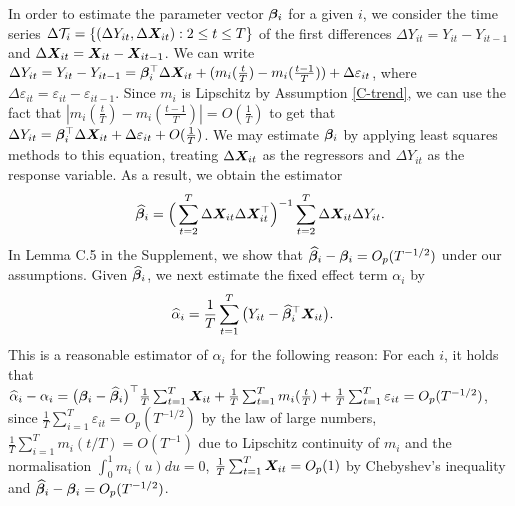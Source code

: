 \documentclass[12pt]{article}
\begin{document}
In order to estimate the parameter vector $\bm{\beta}_i$ for a given $i$, we consider the time series $\Delta \mathcal{T}_i = \{(\Delta Y_{it}, \Delta \boldsymbol{X}_{it}): 2 \leq t \leq T\}$ of the first differences $\Delta Y_{it} = Y_{it} - Y_{i t-1}$ and $\Delta  \boldsymbol{X}_{it} =  \boldsymbol{X}_{it} - \boldsymbol{X}_{it-1}$. We can write $\Delta Y_{it} = Y_{it} - Y_{i t-1} =\bm{\beta}_i^\top \Delta \boldsymbol{X}_{it} + (m_i (\frac{t}{T}) - m_i (\frac{t-1}{T})) + \Delta \varepsilon_{it}$, where $ \Delta \varepsilon_{it} = \varepsilon_{it} - \varepsilon_{i t-1}$. Since $m_i$ is Lipschitz by Assumption \ref{C-trend}, we can use the fact that $ |m_i ( \frac{t}{T} ) - m_i (\frac{t-1}{T}) | = O(\frac{1}{T})$ to get that $\Delta Y_{it} = \bm{\beta}_i^\top \Delta \boldsymbol{X}_{it} + \Delta \varepsilon_{it} + O(\frac{1}{T})$. We may estimate $\bm{\beta}_i$ by applying least squares methods to this equation, treating $\Delta \boldsymbol{X}_{it}$ as the regressors and $\Delta Y_{it}$ as the response variable. As a result, we obtain the estimator
\begin{align}\label{eq:beta:est}
\widehat{\bm{\beta}}_i = \Big( \sum_{t=2}^T \Delta \boldsymbol{X}_{it} \Delta \boldsymbol{X}_{it}^\top \Big)^{-1} \sum_{t=2}^T \Delta \boldsymbol{X}_{it} \Delta Y_{it}.
\end{align}
In Lemma C.5 %
in the Supplement, we show that $\widehat{\bm{\beta}}_i - \bm{\beta}_i = O_p(T^{-1/2})$ under our assumptions. Given $\widehat{\bm{\beta}}_i$, we next estimate the fixed effect term $\alpha_i$ by 
\begin{align}\label{eq:alpha:est}
\widehat{\alpha}_i &= \frac{1}{T}\sum_{t=1}^T \big(Y_{it} - \widehat{\bm{\beta}}_i^\top \boldsymbol{X}_{it}\big). 
\end{align}
This is a reasonable estimator of $\alpha_i$ for the following reason: For each $i$, it holds that $\widehat{\alpha}_i - \alpha_i = \big(\bm{\beta}_i - \widehat{\bm{\beta}}_i \big)^\top\frac{1}{T}\sum_{t=1}^T  \boldsymbol{X}_{it} + \frac{1}{T}\sum_{t=1}^T m_i(\frac{t}{T}) + \frac{1}{T}\sum_{t=1}^T \varepsilon_{it} = O_p(T^{-1/2})$, since $\frac{1}{T}\sum_{i=1}^T \varepsilon_{it} = O_p(T^{-1/2})$ by the law of large numbers, $\frac{1}{T}\sum_{i=1}^T m_i(t/T) = O(T^{-1})$ due to Lipschitz continuity of $m_i$ and the normalisation $\int_{0}^1 m_i(u)du = 0$, $\frac{1}{T}\sum_{t=1}^T  \boldsymbol{X}_{it} = O_p(1)$ by Chebyshev's inequality and $\widehat{\bm{\beta}}_i - \bm{\beta}_i = O_p (T^{-1/2})$. 
\end{document}

